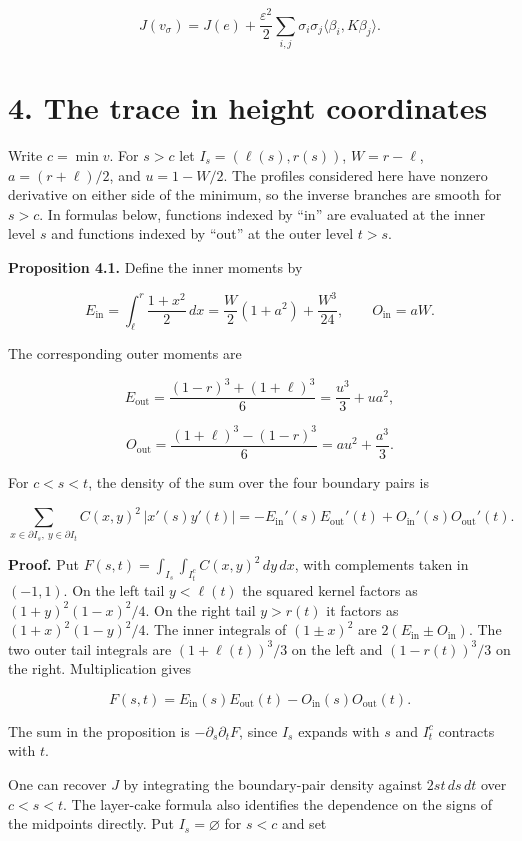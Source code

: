 \documentclass[11pt,letterpaper]{article}
\begin{document}
\[J(v_\sigma)=J(e)+\frac{\varepsilon^2}{2}\sum_{i,j}\sigma_i\sigma_j\langle\beta_i,K\beta_j\rangle.\]

\section{4. The trace in height coordinates}\label{the-trace-in-height-coordinates}

Write \(c=\min v\). For \(s>c\) let \(I_s=(\ell(s),r(s))\), \(W=r-\ell\), \(a=(r+\ell)/2\),
and \(u=1-W/2\). The profiles considered here have nonzero derivative on either side of the
minimum, so the inverse branches are smooth for \(s>c\). In formulas below, functions
indexed by ``in'' are evaluated at the inner level \(s\) and functions indexed by ``out'' at
the outer level \(t>s\).

\textbf{Proposition 4.1.} Define the inner moments by

\[E_{\mathrm{in}}=\int_{\ell}^{r}\frac{1+x^2}{2}\,dx=\frac{W}{2}(1+a^2)+\frac{W^3}{24},\qquad O_{\mathrm{in}}=aW.\]

The corresponding outer moments are

\[E_{\mathrm{out}}=\frac{(1-r)^3+(1+\ell)^3}{6}=\frac{u^3}{3}+ua^2,\]

\[O_{\mathrm{out}}=\frac{(1+\ell)^3-(1-r)^3}{6}=au^2+\frac{a^3}{3}.\]

For \(c<s<t\), the density of the sum over the four boundary pairs is

\[\sum_{x\in\partial I_s,\ y\in\partial I_t} C(x,y)^2\,|x'(s)y'(t)|=-E_{\mathrm{in}}'(s)E_{\mathrm{out}}'(t)+O_{\mathrm{in}}'(s)O_{\mathrm{out}}'(t).\]

\textbf{Proof.} Put \(F(s,t)=\int_{I_s}\int_{I_t^c}C(x,y)^2\,dy\,dx\), with complements
taken in \((-1,1)\). On the left tail \(y<\ell(t)\) the squared kernel factors as
\((1+y)^2(1-x)^2/4\). On the right tail \(y>r(t)\) it factors as \((1+x)^2(1-y)^2/4\). The
inner integrals of \((1\pm x)^2\) are \(2(E_{\mathrm{in}}\pm O_{\mathrm{in}})\). The two
outer tail integrals are \((1+\ell(t))^3/3\) on the left and \((1-r(t))^3/3\) on the right.
Multiplication gives

\[F(s,t)=E_{\mathrm{in}}(s)E_{\mathrm{out}}(t)-O_{\mathrm{in}}(s)O_{\mathrm{out}}(t).\]

The sum in the proposition is \(-\partial_s\partial_tF\), since \(I_s\) expands with \(s\)
and \(I_t^c\) contracts with \(t\).

One can recover \(J\) by integrating the boundary-pair density against \(2st\,ds\,dt\) over
\(c<s<t\). The layer-cake formula also identifies the dependence on the signs of the
midpoints directly. Put \(I_s=\varnothing\) for \(s<c\) and set
\end{document}
